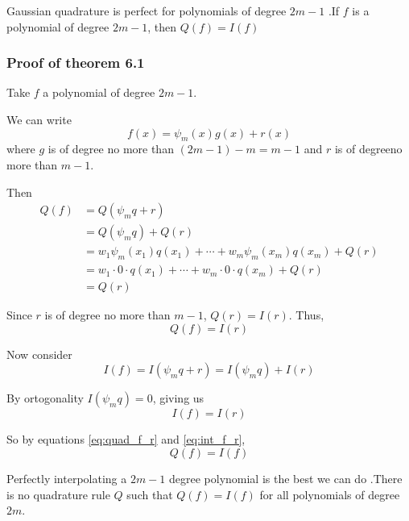 \documentclass[12pt,letterpaper]{article}
\begin{document}
\begin{theo}{Gaussian quadrature is perfect for polynomials of degree $2m-1$}
.If $f$ is a polynomial of degree $2m-1$, then $Q(f) = I(f)$
\label{thm:gauss_perfect}
\end{theo}

\subsubsection*{Proof of theorem 6.1}
Take $f$ a polynomial of degree $2m-1$.

We can write
\begin{equation}
	f(x) = \psi_m(x) g(x) + r(x)
\end{equation}
where $g$ is of degree no more than $(2m-1)-m = m-1$ and $r$ is of degreeno more than $m-1$.

Then
\begin{align}
	Q(f) &= Q(\psi_m q + r) \\
	&= Q(\psi_m q) + Q(r) \\
	&= w_1 \psi_m(x_1)q(x_1) + \cdots + w_m \psi_m(x_m)q(x_m) + Q(r) \\
	&= w_1 \cdot 0 \cdot q(x_1) + \cdots + w_m \cdot 0 \cdot q(x_m) + Q(r) \\
	&= Q(r)
\end{align}

Since $r$ is of degree no more than $m-1$, $Q(r) = I(r)$. Thus,
\begin{equation}\label{eq:quad_f_r}
	Q(f) = I(r)
\end{equation}

Now consider
\begin{equation}
	I(f) = I(\psi_m q + r) = I(\psi_m q) + I(r)
\end{equation}

By ortogonality $I(\psi_m q) = 0$, giving us
\begin{equation}\label{eq:int_f_r}
	I(f) = I(r)
\end{equation}

So by equations \ref{eq:quad_f_r} and \ref{eq:int_f_r},
\begin{equation}
	Q(f) = I(f)
\end{equation}

\begin{theo}{Perfectly interpolating a $2m-1$ degree polynomial is the best we can do}
.There is no quadrature rule $Q$ such that $Q(f) = I(f)$ for all polynomials of degree $2m$.
\label{thm:gauss_perfect}
\end{theo}
\end{document}
